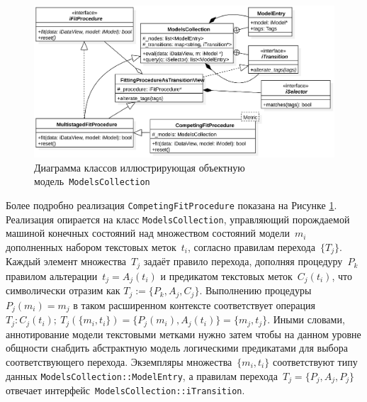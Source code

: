 \begin{figure}
    \centering
    \includegraphics[width=1\linewidth]{images/umff-CompetingFitProcedureClassDiagram-01.eps}
    \caption{Диаграмма классов иллюстрирующая объектную
    модель~\texttt{ModelsCollection}}
    \label{fig:CompetingFitProcedureCollection}
\end{figure}

Более подробно реализация \texttt{CompetingFitProcedure} показана
на Рисунке \ref{fig:CompetingFitProcedureCollection}.  Реализация
опирается на класс \texttt{ModelsCollection},
управляющий порождаемой машиной конечных состояний над множеством состояний
модели~$m_i$ дополненных набором текстовых меток~$t_i$, согласно
правилам перехода~$\{T_j\}$. Каждый
элемент множества~$T_j$ задаёт правило перехода,
дополняя процедуру~$P_k$ правилом альтерации~$t_j = A_j(t_i)$
и предикатом текстовых меток~$C_j(t_i)$, что
символически отразим как $T_j:=\{P_k, A_j, C_j\}$. Выполнению процедуры
$P_j(m_i) = m_j$ в таком расширенном контексте соответствует
операция $T_j:C_j(t_i);~T_j(\{m_i,t_i\}) = \{P_j(m_i), A_j(t_i)\} = \{m_j, t_j\}$.
Иными словами, аннотирование модели текстовыми метками нужно затем
чтобы на данном уровне общности снабдить абстрактную модель логическими
предикатами для выбора соответствующего перехода. Экземпляры
множества~$\{m_i,t_i\}$ соответствуют типу
данных \texttt{ModelsCollection::ModelEntry}, а правилам
перехода~$T_j=\{P_j, A_j, P_j\}$ отвечает интерфейс~\texttt{ModelsCollection::iTransition}.


